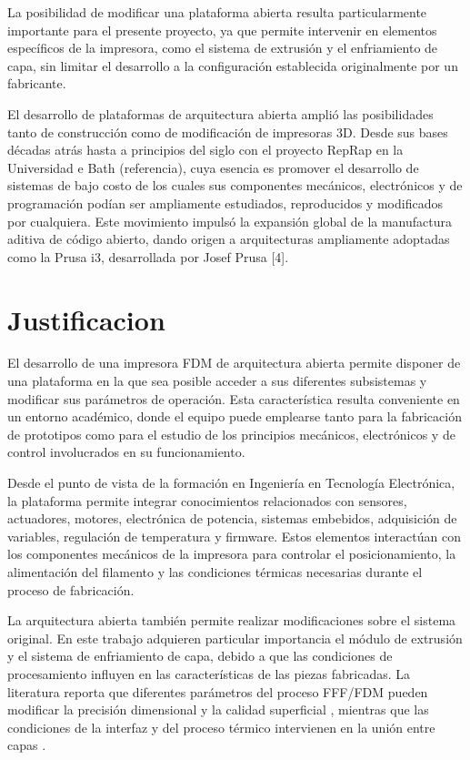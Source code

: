 La posibilidad de modificar una plataforma abierta resulta particularmente importante para el presente proyecto, ya que permite intervenir en elementos específicos de la impresora, como el sistema de extrusión y el enfriamiento de capa, sin limitar el desarrollo a la configuración establecida originalmente por un fabricante.


El desarrollo de plataformas de arquitectura abierta amplió las posibilidades tanto de construcción como de modificación de impresoras 3D. Desde sus bases décadas atrás hasta a principios del siglo con el proyecto RepRap en la Universidad e Bath (referencia), cuya esencia es promover el desarrollo de sistemas de bajo costo de los cuales sus componentes mecánicos, electrónicos y de programación podían ser ampliamente estudiados, reproducidos y modificados por cualquiera. Este movimiento
impulsó la expansión global de la manufactura aditiva de código abierto, dando origen a
arquitecturas ampliamente adoptadas como la Prusa i3, desarrollada por Josef Prusa [4].

\section{Justificacion}
El desarrollo de una impresora FDM de arquitectura abierta permite disponer de una plataforma en la que sea posible acceder a sus diferentes subsistemas y modificar sus parámetros de operación. Esta característica resulta conveniente en un entorno académico, donde el equipo puede emplearse tanto para la fabricación de prototipos como para el estudio de los principios mecánicos, electrónicos y de control involucrados en su funcionamiento.

Desde el punto de vista de la formación en Ingeniería en Tecnología Electrónica, la plataforma permite integrar conocimientos relacionados con sensores, actuadores, motores, electrónica de potencia, sistemas embebidos, adquisición de variables, regulación de temperatura y firmware. Estos elementos interactúan con los componentes mecánicos de la impresora para controlar el posicionamiento, la alimentación del filamento y las condiciones térmicas necesarias durante el proceso de fabricación.

La arquitectura abierta también permite realizar modificaciones sobre el sistema original. En este trabajo adquieren particular importancia el módulo de extrusión y el sistema de enfriamiento de capa, debido a que las condiciones de procesamiento influyen en las características de las piezas fabricadas. La literatura reporta que diferentes parámetros del proceso FFF/FDM pueden modificar la precisión dimensional y la calidad superficial \cite{kechagias_2022}, mientras que las condiciones de la interfaz y del proceso térmico intervienen en la unión entre capas \cite{zhang_2019}.

